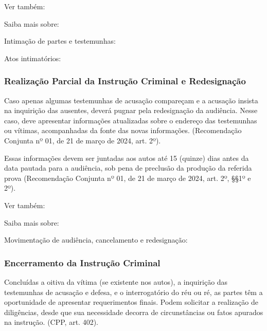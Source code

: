 \documentclass[letterpaper,10pt,brazil]{sphinxmanual}
\begin{document}
\begin{sphinxseealso}{Ver também:}

\sphinxAtStartPar
Saiba mais sobre:

\sphinxAtStartPar
Intimação de partes e testemunhas: {\hyperref[\detokenize{projud_34_intimarperitooj::doc}]{}}

\sphinxAtStartPar
Atos intimatórios: {\hyperref[\detokenize{projud_58_cadastrocumprimentomedida::doc}]{}}


\end{sphinxseealso}



\subsubsection{Realização Parcial da Instrução Criminal e Redesignação}
\label{\detokenize{07termoAIJ:realizacao-parcial-da-instrucao-criminal-e-redesignacao}}
\sphinxAtStartPar
Caso apenas algumas testemunhas de acusação compareçam e a acusação insista na inquirição das ausentes, deverá pugnar pela redesignação da audiência.
Nesse caso, deve apresentar informações atualizadas sobre o endereço das testemunhas ou vítimas, acompanhadas da fonte das novas informações. (Recomendação Conjunta nº 01, de 21 de março de 2024, art. 2º).

\sphinxAtStartPar
Essas informações devem ser juntadas aos autos até 15 (quinze) dias antes da data pautada para a audiência, sob pena de preclusão da produção da referida prova (Recomendação Conjunta nº 01, de 21 de março de 2024, art. 2º, \S{}\S{}1º e 2º).


\begin{sphinxseealso}{Ver também:}

\sphinxAtStartPar
Saiba mais sobre:

\sphinxAtStartPar
Movimentação de audiência, cancelamento e redesignação: {\hyperref[\detokenize{projud_47_movimentacaoaudiencia::doc}]{}}


\end{sphinxseealso}



\subsubsection{Encerramento da Instrução Criminal}
\label{\detokenize{07termoAIJ:encerramento-da-instrucao-criminal}}
\sphinxAtStartPar
Concluídas a oitiva da vítima (se existente nos autos), a inquirição das testemunhas de acusação e defesa, e o interrogatório do réu ou ré, as partes têm a oportunidade de apresentar requerimentos finais.
Podem solicitar a realização de diligências, desde que sua necessidade decorra de circunstâncias ou fatos apurados na instrução. (CPP, art. 402).
\end{document}
